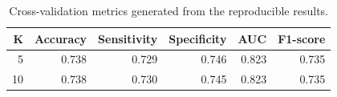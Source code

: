 \begin{table}[H]
\centering
\caption{Cross-validation metrics generated from the reproducible results.}
\label{tab:py_cross_validation}
\begin{tabular}{rrrrrr}
\toprule
K & Accuracy & Sensitivity & Specificity & AUC & F1-score \\
\midrule
5 & 0.738 & 0.729 & 0.746 & 0.823 & 0.735 \\
10 & 0.738 & 0.730 & 0.745 & 0.823 & 0.735 \\
\bottomrule
\end{tabular}
\end{table}
